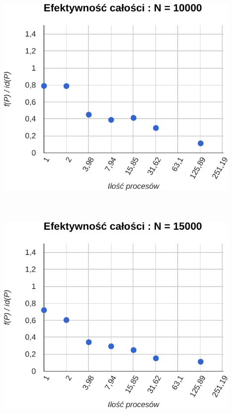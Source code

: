 \documentclass[paper=a4, fontsize=11pt]{scrartcl}	%
\numberwithin{equation}{section}		%
\numberwithin{figure}{section}			%
\numberwithin{table}{section}				%
\begin{document}
\includegraphics[width=120mm]{report/eff-10000.pdf} \\ \ \\ \ \\ \ \\

\includegraphics[width=120mm]{report/eff-15000.pdf} \\ \ \\ \ \\ \ \\
\end{document}
